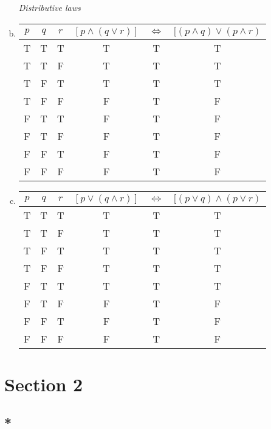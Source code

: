 \documentclass[12pt]{scrartcl} %
\begin{document}
\begin{enumerate}[(a)]
\emph{Distributive laws}
\item \begin{tabular}{*{3}{c}|*{3}{c}}$p$&$q$&$r$&$[p \land (q \lor r)]$&$\iff$&$[(p \land q) \lor (p \land r)$\\
\hline
T&T&T&T&T&T\\
T&T&F&T&T&T\\
T&F&T&T&T&T\\
T&F&F&F&T&F\\
F&T&T&F&T&F\\
F&T&F&F&T&F\\
F&F&T&F&T&F\\
F&F&F&F&T&F\\
\end{tabular}

\item \begin{tabular}{*{3}{c}|*{3}{c}}$p$&$q$&$r$&$[p \lor (q \land r)]$&$\iff$&$[(p \lor q) \land (p \lor r)$\\
\hline
T&T&T&T&T&T\\
T&T&F&T&T&T\\
T&F&T&T&T&T\\
T&F&F&T&T&T\\
F&T&T&T&T&T\\
F&T&F&F&T&F\\
F&F&T&F&T&F\\
F&F&F&F&T&F\\
\end{tabular}
\end{enumerate}
\section{Section 2}

\subsection{*}
\end{document}
